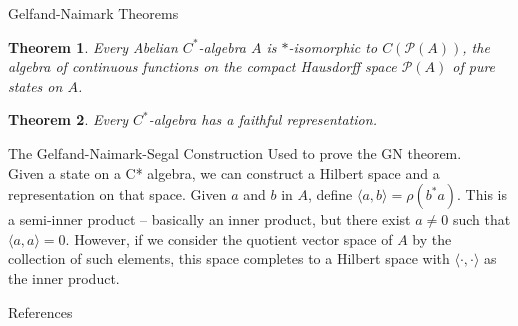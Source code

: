 \documentclass[11pt]{beamer}
\theoremstyle{definition}
\theoremstyle{plain}
\newtheorem{thm}{Theorem}
\renewcommand{\P}[1]{\mathscr{P}(#1)}
\begin{document}
\begin{frame} {Gelfand-Naimark Theorems}
	\begin{thm}
		Every Abelian $C^\ast$-algebra $A$ is $\ast$-isomorphic to $C(\P A)$, the 
		algebra of continuous functions on the compact Hausdorff space $\P A$ of pure 
		states on $A$.
	\end{thm}
	\pause
	\begin{thm}
		Every $C^\ast$-algebra has a faithful representation.
	\end{thm}
\end{frame}

\begin{frame} {The Gelfand-Naimark-Segal Construction}
	Used to prove the GN theorem. \\
	Given a state on a C* algebra, we can construct a Hilbert space and a representation on that space.
	Given $a$ and $b$ in $A$, define $\langle a, b \rangle = \rho(b^\ast a)$. This is a semi-inner product -- basically an inner product, but there exist $a \neq 0$ such that $\langle a,a \rangle = 0$.
	However, if we consider the quotient vector space of $A$ by the collection of such elements, this space completes to a Hilbert space with $\langle \cdot , \cdot \rangle$ as the inner product.
\end{frame}

\begin{frame} {References}
	
\end{frame}
\end{document}
